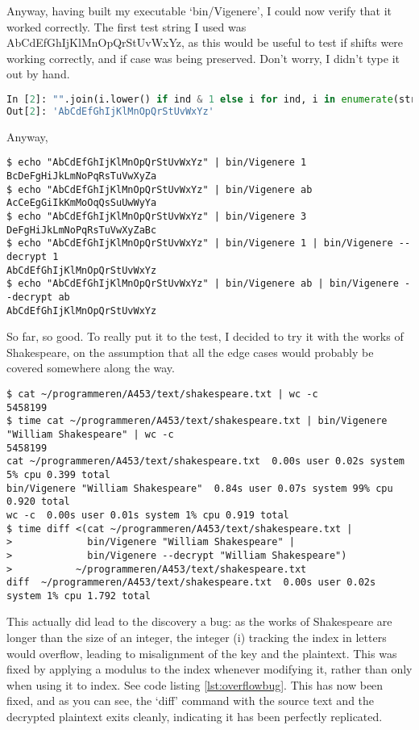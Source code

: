 \documentclass{article}
\begin{document}
    Anyway, having built my executable `bin/Vigenere', I could now verify that
    it worked correctly. The first test string I used was
    AbCdEfGhIjKlMnOpQrStUvWxYz, as this would be useful to test if shifts were
    working correctly, and if case was being preserved. Don't worry, I didn't
    type it out by hand.

\begin{lstlisting}[language=Python, caption=Alphabet]
In [2]: "".join(i.lower() if ind & 1 else i for ind, i in enumerate(string.ascii_uppercase))
Out[2]: 'AbCdEfGhIjKlMnOpQrStUvWxYz'
\end{lstlisting}
    
    Anyway,

\begin{lstlisting}[caption=Testing bin/Vigenere]
$ echo "AbCdEfGhIjKlMnOpQrStUvWxYz" | bin/Vigenere 1
BcDeFgHiJkLmNoPqRsTuVwXyZa
$ echo "AbCdEfGhIjKlMnOpQrStUvWxYz" | bin/Vigenere ab
AcCeEgGiIkKmMoOqQsSuUwWyYa
$ echo "AbCdEfGhIjKlMnOpQrStUvWxYz" | bin/Vigenere 3 
DeFgHiJkLmNoPqRsTuVwXyZaBc
$ echo "AbCdEfGhIjKlMnOpQrStUvWxYz" | bin/Vigenere 1 | bin/Vigenere --decrypt 1
AbCdEfGhIjKlMnOpQrStUvWxYz
$ echo "AbCdEfGhIjKlMnOpQrStUvWxYz" | bin/Vigenere ab | bin/Vigenere --decrypt ab
AbCdEfGhIjKlMnOpQrStUvWxYz
\end{lstlisting}
\iffalse $ \fi %

    So far, so good. To really put it to the test, I decided to try it with the
    works of Shakespeare, on the assumption that all the edge cases would
    probably be covered somewhere along the way.

\begin{lstlisting}[caption=Shakespeare]
$ cat ~/programmeren/A453/text/shakespeare.txt | wc -c                                          
5458199
$ time cat ~/programmeren/A453/text/shakespeare.txt | bin/Vigenere "William Shakespeare" | wc -c
5458199
cat ~/programmeren/A453/text/shakespeare.txt  0.00s user 0.02s system 5% cpu 0.399 total
bin/Vigenere "William Shakespeare"  0.84s user 0.07s system 99% cpu 0.920 total
wc -c  0.00s user 0.01s system 1% cpu 0.919 total
$ time diff <(cat ~/programmeren/A453/text/shakespeare.txt |
>             bin/Vigenere "William Shakespeare" |
>             bin/Vigenere --decrypt "William Shakespeare")
>           ~/programmeren/A453/text/shakespeare.txt 
diff  ~/programmeren/A453/text/shakespeare.txt  0.00s user 0.02s system 1% cpu 1.792 total
\end{lstlisting}
\iffalse $ \fi %

    This actually did lead to the discovery a bug: as the works of Shakespeare
    are longer than the size of an integer, the integer (i) tracking the index
    in letters would overflow, leading to misalignment of the key and the
    plaintext. This was fixed by applying a modulus to the index whenever
    modifying it, rather than only when using it to index. See code listing
    \ref{lst:overflowbug}. This has now been fixed, and as you can see, the
    `diff' command with the source text and the decrypted plaintext exits
    cleanly, indicating it has been perfectly replicated.
\end{document}
